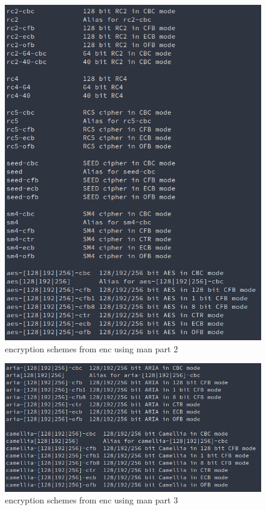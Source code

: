 \documentclass[12pt]{article}
\begin{document}
\begin{figure}[H]
    \begin{center}
        \includegraphics[scale=0.48]{t2p2.png}
    \end{center}{}
    \caption{encryption schemes from enc using man part 2}
    \label{fig:t2p2}
\end{figure}

\begin{figure}[H]
    \begin{center}
        \includegraphics[scale=0.48]{t2p3.png}
    \end{center}{}
    \caption{encryption schemes from enc using man part 3}
    \label{fig:t2p3}
\end{figure}
\end{document}

